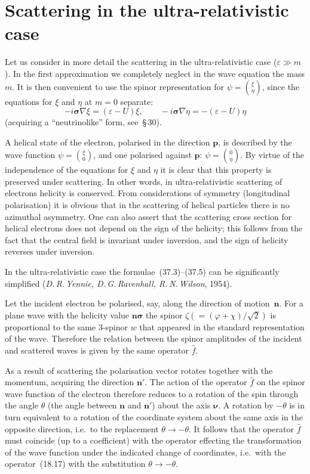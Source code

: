 \section{Scattering in the ultra-relativistic case}

Let us consider in more detail the scattering in the ultra-relativistic case ($\varepsilon \gg m$). In the first approximation we completely neglect in the wave equation the mass $m$. It is then convenient to use the spinor representation for $\psi = \binom{\xi}{\eta}$, since the equations for $\xi$ and $\eta$ at $m = 0$ separate:
\begin{equation}
-i\boldsymbol{\sigma}\nabla\xi = (\varepsilon - U)\xi,\qquad -i\boldsymbol{\sigma}\nabla\eta = -(\varepsilon - U)\eta
\tag{38.1}
\end{equation}
(acquiring a ``neutrinolike'' form, see~\S\,30).

A helical state of the electron, polarised in the direction $\mathbf{p}$, is described by the wave function $\psi = \binom{\xi}{0}$, and one polarised against $\mathbf{p}$: $\psi = \binom{0}{\eta}$. By virtue of the independence of the equations for $\xi$ and $\eta$ it is clear that this property is preserved under scattering. In other words, in ultra-relativistic scattering of electrons helicity is conserved. From considerations of symmetry (longitudinal polarisation) it is obvious that in the scattering of helical particles there is no azimuthal asymmetry. One can also assert that the scattering cross section for helical electrons does not depend on the sign of the helicity; this follows from the fact that the central field is invariant under inversion, and the sign of helicity reverses under inversion.

In the ultra-relativistic case the formulae~(37.3)--(37.5) can be significantly simplified (\textit{D.\,R.\,Yennie, D.\,G.\,Ravenhall, R.\,N.\,Wilson}, 1954).

Let the incident electron be polarised, say, along the direction of motion~$\mathbf{n}$. For a plane wave with the helicity value $\mathbf{n}\boldsymbol{\sigma}$ the spinor $\zeta(= (\varphi + \chi)/\sqrt{2})$ is proportional to the same 3-spinor $w$ that appeared in the standard representation of the wave. Therefore the relation between the spinor amplitudes of the incident and scattered waves is given by the same operator $\widehat f$.

As a result of scattering the polarisation vector rotates together with the momentum, acquiring the direction $\mathbf{n}'$. The action of the operator $\widehat f$ on the spinor wave function of the electron therefore reduces to a rotation of the spin through the angle $\theta$ (the angle between $\mathbf{n}$ and $\mathbf{n}'$) about the axis $\boldsymbol{\nu}$. A rotation by $-\theta$ is in turn equivalent to a rotation of the coordinate system about the same axis in the opposite direction, i.e.\ to the replacement $\theta \to -\theta$. It follows that the operator $\widehat f$ must coincide (up to a coefficient) with the operator effecting the transformation of the wave function under the indicated change of coordinates, i.e.\ with the operator~(18.17) with the substitution $\theta \to -\theta$.

